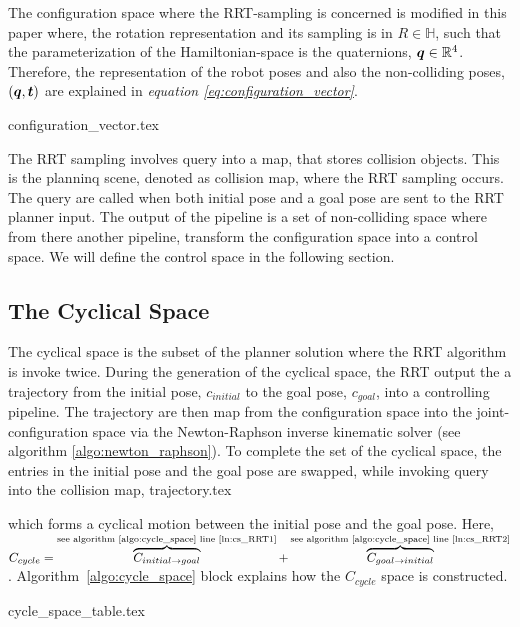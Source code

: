 \documentclass[a4paper, 10pt]{article}
\newcommand\thisPaperDir{/home/asl/version-control/ws_thesis/writing_papers/resampling_planning_in_dynamic_environment}
\numberwithin{equation}{section} %
\begin{document}
The configuration space where 
the RRT-sampling is concerned is modified in this paper where, 
the rotation representation and its sampling is in
$R \in \mathbb{H}$, such that the parameterization of
the Hamiltonian-space is the quaternions,
$\vb*{q} \in \mathbb{R}^4$. Therefore, the representation of the robot poses
and also the non-colliding poses, $(\vb*{q},\vb*{t})$ 
are explained in \textit{equation \ref{eq:configuration_vector}}.

{configuration_vector.tex}

The RRT sampling involves query into a map, that stores collision objects.
This is the planninq scene, denoted as collision map, where the RRT sampling occurs.
The query are
called when both initial pose and a goal pose are sent to the RRT planner input. 
The output of the pipeline is a set of non-colliding space where from there another
pipeline, transform the configuration space into a control space. We will define
the control space in the following section.
\subsection{The Cyclical Space}
The cyclical space is the subset of the planner solution where the RRT algorithm is invoke
twice. 
During the generation of the cyclical space,  the RRT
output the a trajectory from the
initial pose, $c_{initial}$ to the goal pose, $c_{goal}$, 
into a controlling pipeline. The trajectory
are then map from the configuration space into the joint-configuration space via
the Newton-Raphson inverse kinematic solver (see algorithm \ref{algo:newton_raphson}). To complete 
the set of the cyclical space, the entries in the initial pose and the goal pose
are swapped, while invoking query into the collision map,
{trajectory.tex}

which forms a cyclical motion between the initial pose and the goal
pose. Here, 
$C_{cycle} = \overbrace{ C_{initial \rightarrow goal}}^\text{see algorithm \ref{algo:cycle_space} line \ref{ln:cs_RRT1}} 
              + \overbrace{C_{goal \rightarrow initial}}^\text{see algorithm \ref{algo:cycle_space} line \ref{ln:cs_RRT2}}$.
Algorithm~\ref{algo:cycle_space} block explains how the $C_{cycle}$ space is constructed.

{cycle_space_table.tex}
\end{document}
